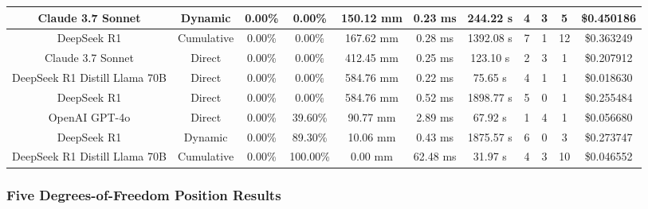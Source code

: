 \begin{landscape}
\begin{table}[H]
\begin{center}
\begin{tabular}{|c|c|c|c|c|c|c|c|c|c|c|}
    \hline
    Claude 3.7 Sonnet & Dynamic & 0.00\% & 0.00\% & 150.12 mm & 0.23 ms & 244.22 s & 4 & 3 & 5 & \$0.450186 \\
    \hline
    DeepSeek R1 & Cumulative & 0.00\% & 0.00\% & 167.62 mm & 0.28 ms & 1392.08 s & 7 & 1 & 12 & \$0.363249 \\
    \hline
    Claude 3.7 Sonnet & Direct & 0.00\% & 0.00\% & 412.45 mm & 0.25 ms & 123.10 s & 2 & 3 & 1 & \$0.207912 \\
    \hline
    DeepSeek R1 Distill Llama 70B & Direct & 0.00\% & 0.00\% & 584.76 mm & 0.22 ms & 75.65 s & 4 & 1 & 1 & \$0.018630 \\
    \hline
    DeepSeek R1 & Direct & 0.00\% & 0.00\% & 584.76 mm & 0.52 ms & 1898.77 s & 5 & 0 & 1 & \$0.255484 \\
    \hline
    OpenAI GPT-4o & Direct & 0.00\% & 39.60\% & 90.77 mm & 2.89 ms & 67.92 s & 1 & 4 & 1 & \$0.056680 \\
    \hline
    DeepSeek R1 & Dynamic & 0.00\% & 89.30\% & 10.06 mm & 0.43 ms & 1875.57 s & 6 & 0 & 3 & \$0.273747 \\
    \hline
    DeepSeek R1 Distill Llama 70B & Cumulative & 0.00\% & 100.00\% & 0.00 mm & 62.48 ms & 31.97 s & 4 & 3 & 10 & \$0.046552 \\
    \hline
\end{tabular}
\label{Results-Position-3-6}
\end{center}
\end{table}

\subsubsection{Five Degrees-of-Freedom Position Results}


\end{landscape}
